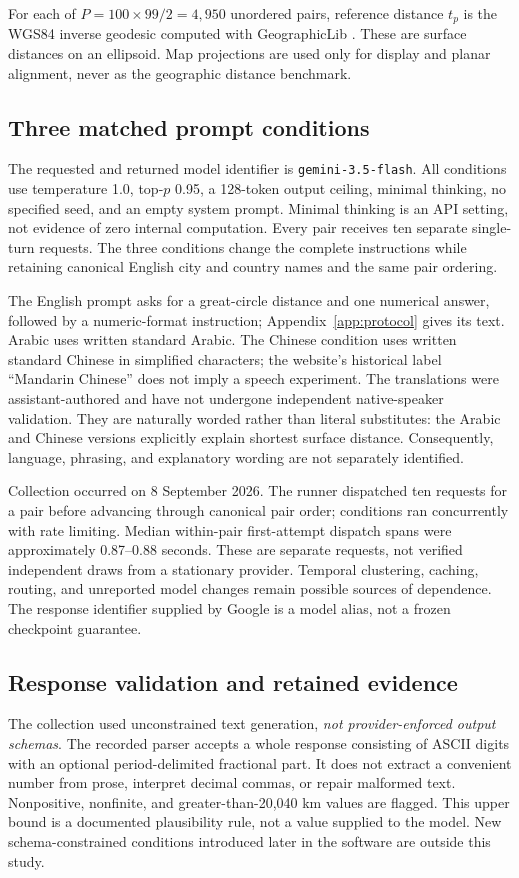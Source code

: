 \documentclass[12pt,a4paper]{article}
\begin{document}
For each of $P=100\times99/2=4{,}950$ unordered pairs, reference distance $t_p$ is the WGS84 inverse geodesic computed with GeographicLib \cite{karney}. These are surface distances on an ellipsoid. Map projections are used only for display and planar alignment, never as the geographic distance benchmark.

\subsection{Three matched prompt conditions}
The requested and returned model identifier is \texttt{gemini-3.5-flash}. All conditions use temperature 1.0, top-$p$ 0.95, a 128-token output ceiling, minimal thinking, no specified seed, and an empty system prompt. Minimal thinking is an API setting, not evidence of zero internal computation. Every pair receives ten separate single-turn requests. The three conditions change the complete instructions while retaining canonical English city and country names and the same pair ordering.

The English prompt asks for a great-circle distance and one numerical answer, followed by a numeric-format instruction; Appendix~\ref{app:protocol} gives its text. Arabic uses written standard Arabic. The Chinese condition uses written standard Chinese in simplified characters; the website's historical label ``Mandarin Chinese'' does not imply a speech experiment. The translations were assistant-authored and have not undergone independent native-speaker validation. They are naturally worded rather than literal substitutes: the Arabic and Chinese versions explicitly explain shortest surface distance. Consequently, language, phrasing, and explanatory wording are not separately identified.

Collection occurred on 8 September 2026. The runner dispatched ten requests for a pair before advancing through canonical pair order; conditions ran concurrently with rate limiting. Median within-pair first-attempt dispatch spans were approximately 0.87--0.88 seconds. These are separate requests, not verified independent draws from a stationary provider. Temporal clustering, caching, routing, and unreported model changes remain possible sources of dependence. The response identifier supplied by Google is a model alias, not a frozen checkpoint guarantee.

\subsection{Response validation and retained evidence}
The collection used unconstrained text generation, \emph{not provider-enforced output schemas}. The recorded parser accepts a whole response consisting of ASCII digits with an optional period-delimited fractional part. It does not extract a convenient number from prose, interpret decimal commas, or repair malformed text. Nonpositive, nonfinite, and greater-than-20,040 km values are flagged. This upper bound is a documented plausibility rule, not a value supplied to the model. New schema-constrained conditions introduced later in the software are outside this study.
\end{document}
